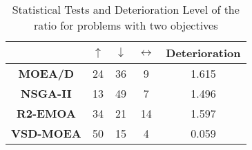 
\begin{table}[t]
\centering
\caption{\scriptsize Statistical Tests and Deterioration Level of the \HV{} ratio for problems with two objectives}
\label{tab:Tests_HV_2obj}

\begin{scriptsize}
\begin{tabular}{c c|c|c|c}
\cline{2-5}
                                        & \textbf{$\uparrow$} & \textbf{$\downarrow$} & \textbf{$\leftrightarrow$} & \textbf{Deterioration} \\ \hline
\multicolumn{1}{c|}{\textbf{MOEA/D}}   & 24                  & 36                    & 9                          & 1.615         \\ \hline
\multicolumn{1}{c|}{\textbf{NSGA-II}}  & 13                  & 49                    & 7                          & 1.496         \\ \hline
\multicolumn{1}{c|}{\textbf{R2-EMOA}}  & 34                  & 21                    & 14                         & 1.597         \\ \hline
\multicolumn{1}{c|}{\textbf{VSD-MOEA}} & 50                  & 15                    & 4                          & 0.059         \\ \hline
\end{tabular}%
\end{scriptsize}
\end{table}


%
